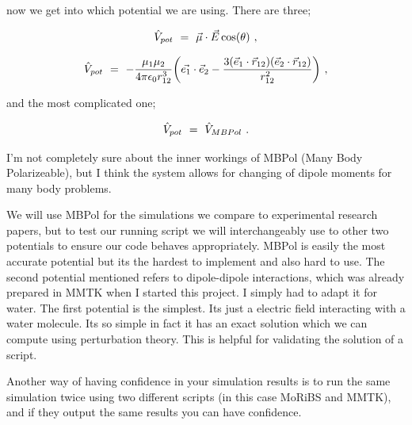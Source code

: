 \documentclass{article}
\begin{document}
now we get into which potential we are using. There are three;

\begin{equation} \label{eb-eq-3-5}
\hat{V}_{pot} \hspace{0.125cm} = \hspace{0.125cm} \vec{\mu} \cdot \vec{E} \cos(\theta) \hspace{0.125cm} ,
\end{equation}

\begin{equation} \label{eb-eq-3-6}
\hat{V}_{pot} \hspace{0.125cm} = \hspace{0.125cm} - \frac{\mu_{1} \mu_{2}}{4 \pi \epsilon_{0} r_{1 2}^{3}} \bigg( \vec{e_1} \cdot \vec{e}_{2} - \frac{3(\vec{e}_{1} \cdot \vec{r}_{1 2})( \vec{e}_{2} \cdot \vec{r}_{1 2})}{r_{1 2}^{2}} \bigg) \hspace{0.125cm} ,
\end{equation}

and the most complicated one;

\begin{equation} \label{eb-eq-3-7}
\hat{V}_{pot} \hspace{0.125cm} = \hspace{0.125cm} \hat{V}_{MBPol}  \hspace{0.125cm} .
\end{equation}

I'm not completely sure about the inner workings of MBPol (Many Body Polarizeable), but I think the system allows for changing of dipole moments for many body problems.

We will use MBPol for the simulations we compare to experimental research papers, but to test our running script we will interchangeably use to other two potentials to ensure our code behaves appropriately. MBPol is easily the most accurate potential but its the hardest to implement and also hard to use. The second potential mentioned refers to dipole-dipole interactions, which was already prepared in MMTK when I started this project. I simply had to adapt it for water. The first potential is the simplest. Its just a electric field interacting with a water molecule. Its so simple in fact it has an exact solution which we can compute using perturbation theory. This is helpful for validating the solution of a script. 

Another way of having confidence in your simulation results is to run the same simulation twice using two different scripts (in this case MoRiBS and MMTK), and if they output the same results you can have confidence. 
\end{document}
